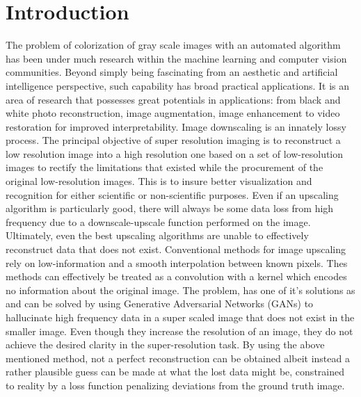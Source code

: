 \documentclass[conference]{IEEEtran}
\begin{document}
\section{Introduction}
The problem of colorization of gray scale images with an automated algorithm has been under much research within the machine learning and computer vision communities. Beyond simply being fascinating from an aesthetic and artificial intelligence perspective, such capability has broad practical applications. It is an area of research that possesses great potentials in applications: from black and white photo reconstruction, image augmentation, image enhancement to video restoration for improved interpretability.
Image downscaling is an innately lossy process. The principal objective of super resolution imaging is to reconstruct a low resolution image into a high resolution one based on a set of low-resolution images to rectify the limitations that existed while the procurement of the original low-resolution images. This is to insure better visualization and recognition for either scientific or non-scientific purposes. Even if an upscaling algorithm is particularly good, there will always be some data loss from high frequency due to a downscale-upscale function performed on the image. Ultimately, even the best upscaling algorithms are unable to effectively reconstruct data that does not exist. Conventional methods for image upscaling rely on low-information and a smooth interpolation between known pixels. Thes methods can effectively be treated as a convolution with a kernel which encodes no information about the original image. The problem, has one of it's solutions as and can be solved by using Generative Adversarial Networks (GANs) to hallucinate high frequency data in a super scaled image that does not exist in the smaller image. Even though they increase the resolution of an image, they do not achieve the desired clarity in the super-resolution task. By using the above mentioned method, not a perfect reconstruction can be obtained albeit instead a rather plausible guess can be made at what the lost data might be, constrained to reality by a loss function penalizing deviations from the ground truth image.\\
\end{document}
